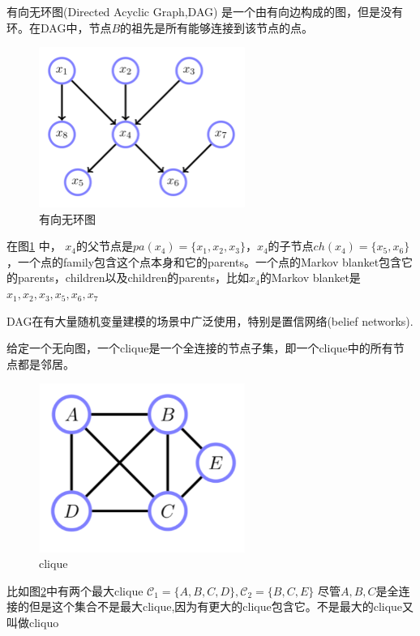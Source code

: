 \documentclass[10pt,a4paper,UTF8]{article}
\begin{document}
\begin{definition}
有向无环图(Directed Acyclic Graph,DAG) 是一个由有向边构成的图，但是没有环。在DAG中，节点\(B\)的祖先是所有能够连接到该节点的点。
\end{definition}

\begin{figure}[htbp]
\centering
\includegraphics[width=0.6\textwidth]{../../img/20170315DAG.png}
\caption{\label{fig:org20d5f6e}
有向无环图}
\end{figure}

在图\ref{fig:org20d5f6e} 中， \(x_{4}\)的父节点是\(pa(x_{4}) = \{x_{1},x_{2},x_{3}\}\)，\(x_{4}\)的子节点\(ch(x_{4}) = \{x_{5},x_{6}\}\)，一个点的family包含这个点本身和它的parents。一个点的Markov blanket包含它的parents，children以及children的parents，比如\(x_{4}\)的Markov blanket是\(x_{1},x_{2},x_{3},x_{5},x_{6},x_{7}\) 

DAG在有大量随机变量建模的场景中广泛使用，特别是置信网络(belief networks).

\begin{definition}
给定一个无向图，一个clique是一个全连接的节点子集，即一个clique中的所有节点都是邻居。
\begin{figure}[htbp]
\centering
\includegraphics[width=0.6\textwidth]{../../img/20170315clique.png}
\caption{\label{fig:orgf99ec57}
clique}
\end{figure}

比如图\ref{fig:orgf99ec57}中有两个最大clique \(\mathcal{C}_{1} = \{A,B,C,D\},\mathcal{C}_{2} = \{B,C,E\}\) 尽管\(A,B,C\)是全连接的但是这个集合不是最大clique,因为有更大的clique包含它。不是最大的clique又叫做cliquo
\end{definition}
\end{document}
